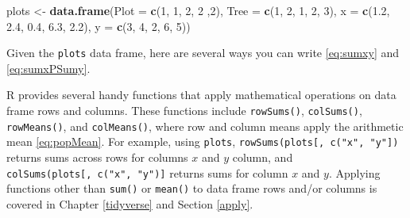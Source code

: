 \documentclass[
  11pt,
]{krantz}
\newenvironment{Shaded}{\begin{snugshade}}{\end{snugshade}}
\newcommand{\CommentTok}[1]{\textcolor[rgb]{0.56,0.35,0.01}{\textit{#1}}}
\newcommand{\DataTypeTok}[1]{\textcolor[rgb]{0.13,0.29,0.53}{#1}}
\newcommand{\DecValTok}[1]{\textcolor[rgb]{0.00,0.00,0.81}{#1}}
\newcommand{\FloatTok}[1]{\textcolor[rgb]{0.00,0.00,0.81}{#1}}
\newcommand{\KeywordTok}[1]{\textcolor[rgb]{0.13,0.29,0.53}{\textbf{#1}}}
\newcommand{\NormalTok}[1]{#1}
\newcommand{\OperatorTok}[1]{\textcolor[rgb]{0.81,0.36,0.00}{\textbf{#1}}}
\newcommand{\StringTok}[1]{\textcolor[rgb]{0.31,0.60,0.02}{#1}}
\theoremstyle{definition}
\theoremstyle{definition}
\theoremstyle{definition}
\theoremstyle{definition}
\theoremstyle{remark}
\begin{document}
\begin{Shaded}
\begin{Highlighting}[]
\NormalTok{plots \textless{}{-}}\StringTok{ }\KeywordTok{data.frame}\NormalTok{(}\DataTypeTok{Plot =} \KeywordTok{c}\NormalTok{(}\DecValTok{1}\NormalTok{, }\DecValTok{1}\NormalTok{, }\DecValTok{2}\NormalTok{, }\DecValTok{2}\NormalTok{ ,}\DecValTok{2}\NormalTok{), }\DataTypeTok{Tree =} \KeywordTok{c}\NormalTok{(}\DecValTok{1}\NormalTok{, }\DecValTok{2}\NormalTok{, }\DecValTok{1}\NormalTok{, }\DecValTok{2}\NormalTok{, }\DecValTok{3}\NormalTok{), }
                    \DataTypeTok{x =} \KeywordTok{c}\NormalTok{(}\FloatTok{1.2}\NormalTok{, }\FloatTok{2.4}\NormalTok{, }\FloatTok{0.4}\NormalTok{, }\FloatTok{6.3}\NormalTok{, }\FloatTok{2.2}\NormalTok{),}
                    \DataTypeTok{y =} \KeywordTok{c}\NormalTok{(}\DecValTok{3}\NormalTok{, }\DecValTok{4}\NormalTok{, }\DecValTok{2}\NormalTok{, }\DecValTok{6}\NormalTok{, }\DecValTok{5}\NormalTok{))}
\end{Highlighting}
\end{Shaded}

Given the \texttt{plots} data frame, here are several ways you can write \eqref{eq:sumxy} and \eqref{eq:sumxPSumy}.

\begin{Shaded}
\end{Shaded}

R provides several handy functions that apply mathematical operations on data frame rows and columns. These functions include \texttt{rowSums()}, \texttt{colSums()}, \texttt{rowMeans()}, and \texttt{colMeans()}, where row and column means apply the arithmetic mean \eqref{eq:popMean}. For example, using \texttt{plots}, \texttt{rowSums(plots{[},\ c("x",\ "y"{]})} returns sums across rows for columns \(x\) and \(y\) column, and \texttt{colSums(plots{[},\ c("x",\ "y"){]}} returns sums for column \(x\) and \(y\). Applying functions other than \texttt{sum()} or \texttt{mean()} to data frame rows and/or columns is covered in Chapter \ref{tidyverse} and Section \ref{apply}.
\end{document}
